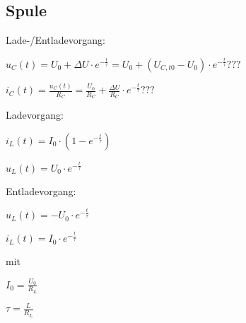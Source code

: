\begin{sectionbox}
	\subsection{Spule}

Lade-/Entladevorgang:
\begin{emphbox}
	$u_C(t) = U_0+ ΔU \cdot e^{-{\frac{t}{τ}}} = U_0+ (U_{C,t0}-U_0) \cdot e^{-{\frac{t}{τ}}} ???$

	$i_C(t) = \frac{u_C(t)}{R_C} = \frac{U_0}{R_C}+\frac{ΔU}{R_C}\cdot e^{-{\frac{t}{τ}}} ???$
\end{emphbox}

Ladevorgang:
\begin{emphbox}

	$i_L(t) = I_0 \cdot (1-e^{-{\frac{t}{τ}}})$

	$u_L(t) = U_0 \cdot e^{-{\frac{t}{τ}}}$

\end{emphbox}

Entladevorgang:
\begin{emphbox}
	$u_L(t) = -U_0 \cdot e^{-{\frac{t}{τ}}}$

	$i_L(t) = I_0 \cdot e^{-{\frac{t}{τ}}}$
\end{emphbox}

mit
\begin{emphbox}
	$I_0 = \frac{U_0}{R_L}$
	
	$τ = \frac{L}{R_L}$	
\end{emphbox}

	
\end{sectionbox}